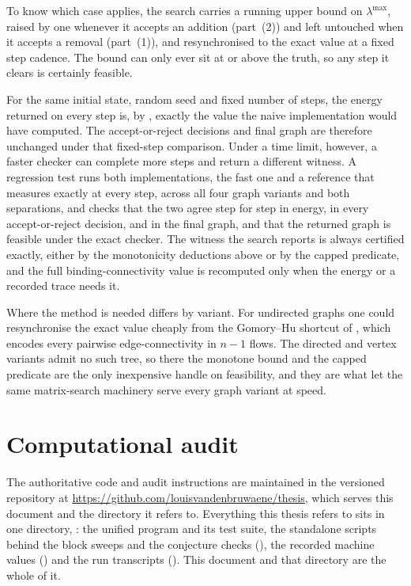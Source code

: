 To know which case applies, the search carries a running upper bound on $\lambda^{\max}$, raised by one whenever it accepts an addition (part~(2)) and left untouched when it accepts a removal (part~(1)), and resynchronised to the exact value at a fixed step cadence. The bound can only ever sit at or above the truth, so any step it clears is certainly feasible.

For the same initial state, random seed and fixed number of steps, the energy returned on every step is, by , exactly the value the naive implementation would have computed. The accept-or-reject decisions and final graph are therefore unchanged under that fixed-step comparison. Under a time limit, however, a faster checker can complete more steps and return a different witness. A regression test runs both implementations, the fast one and a reference that measures exactly at every step, across all four graph variants and both separations, and checks that the two agree step for step in energy, in every accept-or-reject decision, and in the final graph, and that the returned graph is feasible under the exact checker. The witness the search reports is always certified exactly, either by the monotonicity deductions above or by the capped predicate, and the full binding-connectivity value is recomputed only when the energy or a recorded trace needs it.

Where the method is needed differs by variant. For undirected graphs one could resynchronise the exact value cheaply from the Gomory--Hu shortcut of , which encodes every pairwise edge-connectivity in $n - 1$ flows. The directed and vertex variants admit no such tree, so there the monotone bound and the capped predicate are the only inexpensive handle on feasibility, and they are what let the same matrix-search machinery serve every graph variant at speed.

\section{Computational audit}\label{sec:transcripts}
\label{app:code}\label{app:verification-ladder}\label{app:software-tests}
\label{app:software-reproduction}

The authoritative code and audit instructions are maintained in the versioned
repository at \url{https://github.com/louisvandenbruwaene/thesis}, which
serves this document and the  directory it refers to.
Everything this thesis refers to sits in one directory, : the
unified program and its test suite, the standalone scripts behind the block
sweeps and the conjecture checks (), the recorded machine
values () and the run transcripts ().
This document and that directory are the whole of it.

